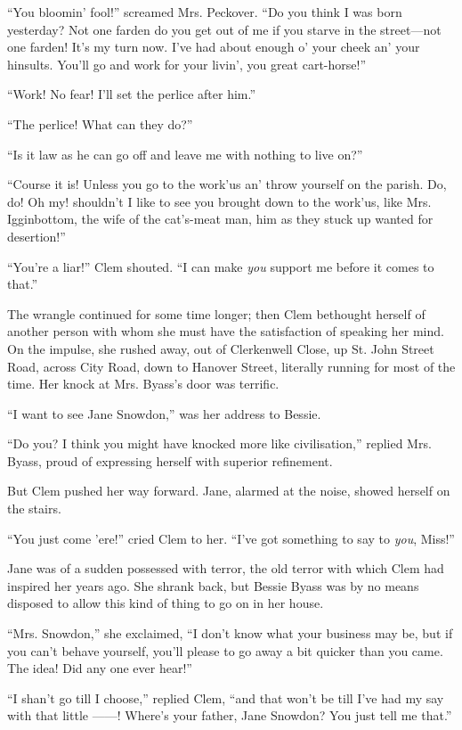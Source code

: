 ``You bloomin' fool!'' screamed Mrs. Peckover. ``Do you think I was born
yesterday? Not one farden do you get out of me if you starve in the
street---not one farden! It's my turn now. I've had about enough o' your
cheek an' your hinsults. You'll go and work for your livin', you great
cart-horse!''

``Work! No fear! I'll set the perlice after him.''

``The perlice! What can they do?''

``Is it law as he can go off and leave me with nothing to live on?''

``Course it is! Unless you go to the work'us an' throw yourself on the
parish. Do, do! Oh my! shouldn't I like to see you brought down to the
work'us, like Mrs. Igginbottom, the wife of the cat's-meat man, him as
they stuck up wanted for desertion!''

``You're a liar!'' Clem shouted. ``I can make \emph{you} support me
before it comes to that.''

{}The wrangle continued for some time longer; then Clem bethought
herself of another person with whom she must have the satisfaction of
speaking her mind. On the impulse, she rushed away, out of Clerkenwell
Close, up St. John Street Road, across City Road, down to Hanover
Street, literally running for most of the time. Her knock at Mrs.
Byass's door was terrific.

``I want to see Jane Snowdon,'' was her address to Bessie.

``Do you? I think you might have knocked more like civilisation,''
replied Mrs. Byass, proud of expressing herself with superior
refinement.

But Clem pushed her way forward. Jane, alarmed at the noise, showed
herself on the stairs.

``You just come 'ere!'' cried Clem to her. ``I've got something to say
to \emph{you}, Miss!''

Jane was of a sudden possessed with terror, the old terror with which
Clem had inspired her years ago. She shrank back, but Bessie Byass was
by no means disposed to allow this kind of thing to go on in her house.

``Mrs. Snowdon,'' she exclaimed, ``I don't {}know what your business may
be, but if you can't behave yourself, you'll please to go away a bit
quicker than you came. The idea! Did any one ever hear!''

``I shan't go till I choose,'' replied Clem, ``and that won't be till
I've had my say with that little {{------}}! Where's your father, Jane
Snowdon? You just tell me that.''

